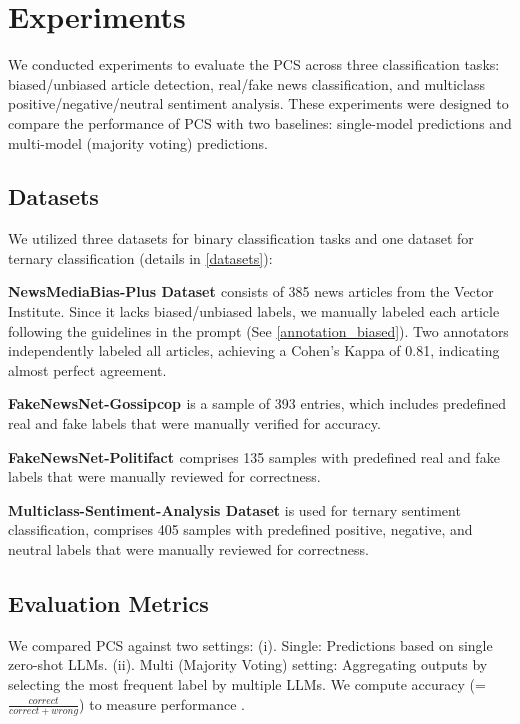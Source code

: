 \section{Experiments}

We conducted experiments to evaluate the PCS across three classification tasks: biased/unbiased article detection, real/fake news classification, and multiclass positive/negative/neutral sentiment analysis. These experiments were designed to compare the performance of PCS with two baselines: single-model predictions and multi-model (majority voting) predictions. 

\subsection{Datasets}

We utilized three datasets for binary classification tasks and one dataset for ternary classification (details in \ref{datasets}):

\noindent\textbf{NewsMediaBias-Plus Dataset \cite{vector_newsmediabias_plus}}  
consists of 385 news articles from the Vector Institute. Since it lacks biased/unbiased labels, we manually labeled each article following the guidelines in the prompt (See \ref{annotation_biased}). Two annotators independently labeled all articles, achieving a Cohen’s Kappa of 0.81, indicating almost perfect agreement.

\noindent\textbf{FakeNewsNet-Gossipcop \cite{shu2018fakenewsnet, shu2017fake, shu2017exploiting}}  
is a sample of 393 entries, which includes predefined real and fake labels that were manually verified for accuracy.

\noindent\textbf{FakeNewsNet-Politifact \cite{shu2018fakenewsnet, shu2017fake, shu2017exploiting}} comprises 135 samples with predefined real and fake labels that were manually reviewed for correctness.

\noindent\textbf{Multiclass-Sentiment-Analysis \cite{hf_multiclass_sentiment} Dataset}  is used for ternary sentiment classification, comprises 405 samples with predefined positive, negative, and neutral labels that were manually reviewed for correctness.

\subsection{Evaluation Metrics}  
We compared PCS against two settings:  
(i). Single: Predictions based on single zero-shot LLMs. (ii). Multi (Majority Voting) setting: Aggregating outputs by selecting the most frequent label by multiple LLMs. We compute accuracy (= $\frac{correct}{correct+wrong}$) to measure performance .


